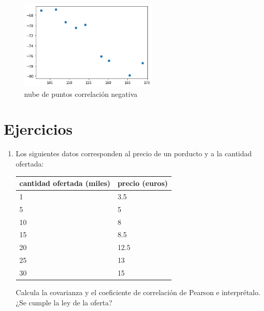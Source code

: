 \documentclass[
]{article}
\begin{document}
\begin{itemize}
  \begin{figure}
  \centering
  \includegraphics[width=2.60417in,height=\textheight]{cloud_menos.png}
  \caption{nube de puntos correlación negativa}
  \end{figure}
\end{itemize}

\hypertarget{ejercicios}{%
\section{Ejercicios}\label{ejercicios}}

\begin{enumerate}
\def\labelenumi{\arabic{enumi}.}
\item
  Los siguientes datos corresponden al precio de un porducto y a la
  cantidad ofertada:

  \begin{longtable}[]{@{}ll@{}}
  \toprule
  cantidad ofertada (miles) & precio (euros)\tabularnewline
  \midrule
  \endhead
  1 & 3.5\tabularnewline
  5 & 5\tabularnewline
  10 & 8\tabularnewline
  15 & 8.5\tabularnewline
  20 & 12.5\tabularnewline
  25 & 13\tabularnewline
  30 & 15\tabularnewline
  \bottomrule
  \end{longtable}

  Calcula la covarianza y el coeficiente de correlación de Pearson e
  interprétalo. ¿Se cumple la ley de la oferta?
\end{enumerate}
\end{document}
